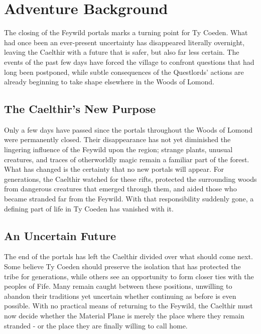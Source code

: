 \section*{\LARGE Adventure Background}
{\entryfont The closing of the Feywild portals marks a turning point for Ty Coeden. What had once been an ever-present uncertainty has disappeared literally overnight, leaving the Caelthir with a future that is safer, but also far less certain. The events of the past few days have forced the village to confront questions that had long been postponed, while subtle consequences of the Questlords' actions are already beginning to take shape elsewhere in the Woods of Lomond.}
\subsection*{The Caelthir's New Purpose}
{\entryfont Only a few days have passed since the portals throughout the Woods of Lomond were permanently closed. Their disappearance has not yet diminished the lingering influence of the Feywild upon the region; strange plants, unusual creatures, and traces of otherworldly magic remain a familiar part of the forest. What has changed is the certainty that no new portals will appear. For generations, the Caelthir watched for these rifts, protected the surrounding woods from dangerous creatures that emerged through them, and aided those who became stranded far from the Feywild. With that responsibility suddenly gone, a defining part of life in Ty Coeden has vanished with it.}
\subsection*{An Uncertain Future}
{\entryfont The end of the portals has left the Caelthir divided over what should come next. Some believe Ty Coeden should preserve the isolation that has protected the tribe for generations, while others see an opportunity to form closer ties with the peoples of Fife. Many remain caught between these positions, unwilling to abandon their traditions yet uncertain whether continuing as before is even possible. With no practical means of returning to the Feywild, the Caelthir must now decide whether the Material Plane is merely the place where they remain stranded - or the place they are finally willing to call home.}
